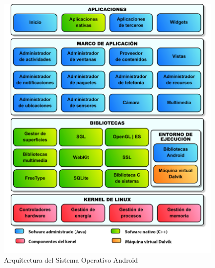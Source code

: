 \begin{figure}[h]
	\begin{center}
		\includegraphics[scale=0.6]{imagenes/pila-android.png}
	\end{center}
	\caption{
		\label{fig:archi}
		Arquitectura del Sistema Operativo Android \cite{AAT}
	}
\end{figure}

